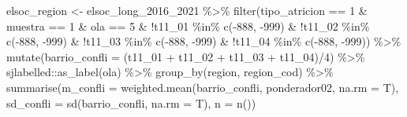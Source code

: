 \documentclass[
  12pt,
]{book}
\newenvironment{Shaded}{\begin{snugshade}}{\end{snugshade}}
\newcommand{\AttributeTok}[1]{\textcolor[rgb]{0.77,0.63,0.00}{#1}}
\newcommand{\DecValTok}[1]{\textcolor[rgb]{0.00,0.00,0.81}{#1}}
\newcommand{\FunctionTok}[1]{\textcolor[rgb]{0.00,0.00,0.00}{#1}}
\newcommand{\NormalTok}[1]{#1}
\newcommand{\OtherTok}[1]{\textcolor[rgb]{0.56,0.35,0.01}{#1}}
\newcommand{\SpecialCharTok}[1]{\textcolor[rgb]{0.00,0.00,0.00}{#1}}
\begin{document}
\begin{Shaded}
\begin{Highlighting}[]
\NormalTok{elsoc\_region }\OtherTok{\textless{}{-}}\NormalTok{ elsoc\_long\_2016\_2021 }\SpecialCharTok{\%\textgreater{}\%} 
  \FunctionTok{filter}\NormalTok{(tipo\_atricion }\SpecialCharTok{==} \DecValTok{1} \SpecialCharTok{\&}\NormalTok{ muestra }\SpecialCharTok{==} \DecValTok{1} \SpecialCharTok{\&}\NormalTok{ ola }\SpecialCharTok{==} \DecValTok{5} \SpecialCharTok{\&} \SpecialCharTok{!}\NormalTok{t11\_01 }\SpecialCharTok{\%in\%} \FunctionTok{c}\NormalTok{(}\SpecialCharTok{{-}}\DecValTok{888}\NormalTok{, }\SpecialCharTok{{-}}\DecValTok{999}\NormalTok{) }\SpecialCharTok{\&}
           \SpecialCharTok{!}\NormalTok{t11\_02 }\SpecialCharTok{\%in\%} \FunctionTok{c}\NormalTok{(}\SpecialCharTok{{-}}\DecValTok{888}\NormalTok{, }\SpecialCharTok{{-}}\DecValTok{999}\NormalTok{) }\SpecialCharTok{\&} \SpecialCharTok{!}\NormalTok{t11\_03 }\SpecialCharTok{\%in\%} \FunctionTok{c}\NormalTok{(}\SpecialCharTok{{-}}\DecValTok{888}\NormalTok{, }\SpecialCharTok{{-}}\DecValTok{999}\NormalTok{) }\SpecialCharTok{\&} \SpecialCharTok{!}\NormalTok{t11\_04 }\SpecialCharTok{\%in\%} \FunctionTok{c}\NormalTok{(}\SpecialCharTok{{-}}\DecValTok{888}\NormalTok{, }\SpecialCharTok{{-}}\DecValTok{999}\NormalTok{)) }\SpecialCharTok{\%\textgreater{}\%} 
  \FunctionTok{mutate}\NormalTok{(}\AttributeTok{barrio\_confli =}\NormalTok{ (t11\_01 }\SpecialCharTok{+}\NormalTok{ t11\_02 }\SpecialCharTok{+}\NormalTok{ t11\_03 }\SpecialCharTok{+}\NormalTok{ t11\_04)}\SpecialCharTok{/}\DecValTok{4}\NormalTok{) }\SpecialCharTok{\%\textgreater{}\%}
\NormalTok{  sjlabelled}\SpecialCharTok{::}\FunctionTok{as\_label}\NormalTok{(ola) }\SpecialCharTok{\%\textgreater{}\%} 
  \FunctionTok{group\_by}\NormalTok{(region, region\_cod) }\SpecialCharTok{\%\textgreater{}\%} 
  \FunctionTok{summarise}\NormalTok{(}\AttributeTok{m\_confli =} \FunctionTok{weighted.mean}\NormalTok{(barrio\_confli, ponderador02, }\AttributeTok{na.rm =}\NormalTok{ T),}
            \AttributeTok{sd\_confli =} \FunctionTok{sd}\NormalTok{(barrio\_confli, }\AttributeTok{na.rm =}\NormalTok{ T),}
            \AttributeTok{n =} \FunctionTok{n}\NormalTok{())}


\end{Highlighting}
\end{Shaded}
\end{document}
